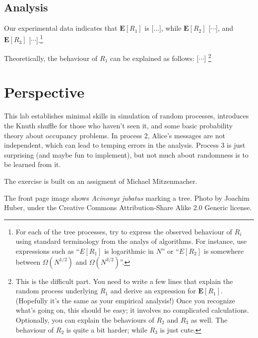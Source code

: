 \documentclass{tufte-handout}
\begin{document}
\subsection{Analysis}

Our experimental data indicates that $\mathbf E [R_1]$ is [$\ldots$],
while $\mathbf E[R_2]$ [$\cdots$], and $\mathbf E[R_3]$
[$\cdots$].\footnote{For each of the tree processes, try to express
  the observed behaviour of $R_i$ using standard terminology from the
  analys of algorithms.
  For instance, use expressions such as ``$E[R_1]$ is logarithmic in
  $N$'' or ``$E[R_2]$ is somewhere between $\Omega(N^{1/2})$ and
  $\Omega(N^{3/2})$''.}

Theoretically, the behaviour of $R_1$ can be explained as follows: [$\cdots$] \footnote{This
  is the difficult part.
  You need to write a few lines that explain the random process
  underlying $R_1$ and derive an expression for $\mathbf E[R_1]$.
  (Hopefully it's the same as your empirical analysis!)
  Once you recognize what's going on, this should be easy; it involves
  no complicated calculations.
  Optionally, you can explain the behaviours of $R_2$ and $R_3$ as
  well.
  The behaviour of $R_2$ is quite a bit harder; while $R_3$ is just
  cute.
}



\newpage
\section{Perspective}

This lab establishes minimal skills in simulation of random processes,
introduces the Knuth shuffle for those who haven't seen it, and some
basic probability theory about occupancy problems.
In process 2, Alice's messages are not independent, which can lead to
temping errors in the analysis.
Process 3 is just surprising (and maybe fun to implement), but not
much about randomness is to be learned from it.

The exercise is built on an assigment of Michael
Mitzenmacher.

The front page image shows \emph{Acinonyx jubatus} marking a
tree. Photo by Joachim Huber, under the Creative Commons Attribution-Share
Alike 2.0 Generic license.
\end{document}
